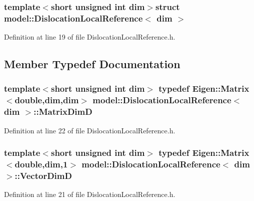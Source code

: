 \subsubsection*{template$<$short unsigned int dim$>$struct model\+::\+Dislocation\+Local\+Reference$<$ dim $>$}



Definition at line 19 of file Dislocation\+Local\+Reference.\+h.



\subsection{Member Typedef Documentation}
\hypertarget{structmodel_1_1_dislocation_local_reference_a0a41d2b614d726c3b2b35a086b1de3ef}{}
\subsubsection[{Matrix\+Dim\+D}]{\setlength{\rightskip}{0pt plus 5cm}template$<$short unsigned int dim$>$ typedef Eigen\+::\+Matrix$<$double,{\bf dim},{\bf dim}$>$ {\bf model\+::\+Dislocation\+Local\+Reference}$<$ {\bf dim} $>$\+::{\bf Matrix\+Dim\+D}}\label{structmodel_1_1_dislocation_local_reference_a0a41d2b614d726c3b2b35a086b1de3ef}


Definition at line 22 of file Dislocation\+Local\+Reference.\+h.

\hypertarget{structmodel_1_1_dislocation_local_reference_a315cfe9ab738ac5e16abff3393e40a06}{}
\subsubsection[{Vector\+Dim\+D}]{\setlength{\rightskip}{0pt plus 5cm}template$<$short unsigned int dim$>$ typedef Eigen\+::\+Matrix$<$double,{\bf dim},1$>$ {\bf model\+::\+Dislocation\+Local\+Reference}$<$ {\bf dim} $>$\+::{\bf Vector\+Dim\+D}}\label{structmodel_1_1_dislocation_local_reference_a315cfe9ab738ac5e16abff3393e40a06}


Definition at line 21 of file Dislocation\+Local\+Reference.\+h.



